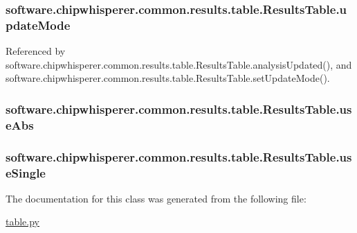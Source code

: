 \hypertarget{classsoftware_1_1chipwhisperer_1_1common_1_1results_1_1table_1_1ResultsTable_ad146fa0755cb7ccb58e25e833943496c}{}
\subsubsection[{update\+Mode}]{\setlength{\rightskip}{0pt plus 5cm}software.\+chipwhisperer.\+common.\+results.\+table.\+Results\+Table.\+update\+Mode}\label{classsoftware_1_1chipwhisperer_1_1common_1_1results_1_1table_1_1ResultsTable_ad146fa0755cb7ccb58e25e833943496c}


Referenced by software.\+chipwhisperer.\+common.\+results.\+table.\+Results\+Table.\+analysis\+Updated(), and software.\+chipwhisperer.\+common.\+results.\+table.\+Results\+Table.\+set\+Update\+Mode().

\hypertarget{classsoftware_1_1chipwhisperer_1_1common_1_1results_1_1table_1_1ResultsTable_aa657c2b4e520ba88b9a3092e72dae859}{}
\subsubsection[{use\+Abs}]{\setlength{\rightskip}{0pt plus 5cm}software.\+chipwhisperer.\+common.\+results.\+table.\+Results\+Table.\+use\+Abs}\label{classsoftware_1_1chipwhisperer_1_1common_1_1results_1_1table_1_1ResultsTable_aa657c2b4e520ba88b9a3092e72dae859}
\hypertarget{classsoftware_1_1chipwhisperer_1_1common_1_1results_1_1table_1_1ResultsTable_ac71e121cdf8a0ec6782af46acfce6666}{}
\subsubsection[{use\+Single}]{\setlength{\rightskip}{0pt plus 5cm}software.\+chipwhisperer.\+common.\+results.\+table.\+Results\+Table.\+use\+Single}\label{classsoftware_1_1chipwhisperer_1_1common_1_1results_1_1table_1_1ResultsTable_ac71e121cdf8a0ec6782af46acfce6666}


The documentation for this class was generated from the following file\+:\begin{DoxyCompactItemize}
\item 
\hyperlink{table_8py}{table.\+py}\end{DoxyCompactItemize}

